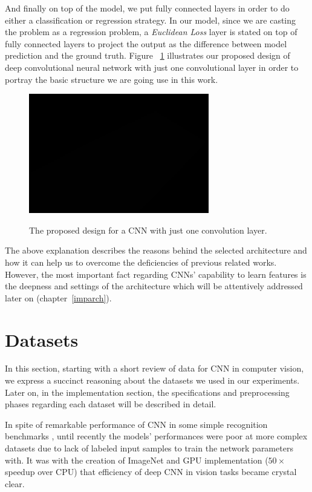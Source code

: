 And finally on top of the model, we put fully connected layers in order to do either a classification or regression strategy. In our model, since we are casting the problem as a regression problem, a \textit{Euclidean Loss} layer is stated on top of fully connected layers to project the output as the difference between model prediction and the ground truth. Figure ~\ref{fig:proposenet} illustrates our proposed design of deep convolutional neural network with just one convolutional layer in order to portray the basic structure we are going use in this work. 

\begin{figure}[H]
	\centering
	{\includegraphics[width=0.7\textwidth]{images/1}}
	\caption{The proposed design for a CNN with just one convolution layer.}
	\label{fig:proposenet}
\end{figure}

The above explanation describes the reasons behind the selected architecture and how it can help us to overcome the deficiencies of previous related works. However, the most important fact regarding CNNs' capability to learn features is the deepness and settings of the architecture which will be attentively addressed later on (chapter~\ref{imparch}).  

\section{Datasets} 

In this section, starting with a short review of data for CNN in computer vision, we express a succinct reasoning about the datasets we used in our experiments. Later on, in the implementation section, the specifications and preprocessing phases regarding each dataset will be described in detail. 

In spite of remarkable  performance of CNN in some simple recognition benchmarks \cite{cirecsan2011convolutional, ciresan2015multi, wan2013regularization, cirecsan2012multi}, until recently the models' performances were poor at more complex datasets \cite{griffin2007caltech} due to lack of labeled input samples to train the network parameters with. It was with the creation of ImageNet\cite{deng2009imagenet} and GPU implementation\cite{krizhevsky2012imagenet} ($50\times$ speedup over CPU) that efficiency of deep CNN in vision tasks became crystal clear.

